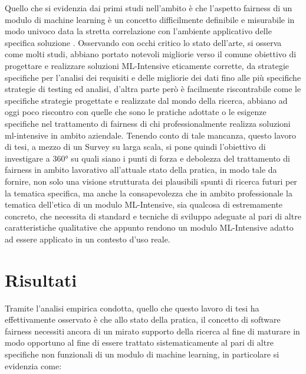Quello che si evidenzia dai primi studi nell'ambito è che l'aspetto fairness di un modulo di machine learning è un concetto difficilmente definibile e misurabile in modo univoco data la stretta correlazione con l'ambiente applicativo delle specifica soluzione \cite{FairnessDefinitionExplained}. Osservando con occhi critico lo stato dell'arte, si osserva come molti studi, abbiano portato notevoli migliorie verso il comune obiettivo di progettare e realizzare soluzioni ML-Intensive eticamente corrette, da strategie specifiche per l'analisi dei requisiti e delle migliorie dei dati fino alle più specifiche strategie di testing ed analisi, d'altra parte però è facilmente riscontrabile come le specifiche strategie progettate e realizzate dal mondo della ricerca, abbiano ad oggi poco riscontro con quelle che sono le pratiche adottate o le esigenze specifiche nel trattamento di fairness di chi professionalmente realizza soluzioni ml-intensive in ambito aziendale. Tenendo conto di tale mancanza, questo lavoro di tesi, a mezzo di un Survey su larga scala, si pone quindi l'obiettivo di investigare a 360° su quali siano i punti di forza e debolezza del trattamento di fairness in ambito lavorativo all'attuale stato della pratica, in modo tale da fornire, non solo una visione strutturata dei plausibili spunti di ricerca futuri per la tematica specifica, ma anche la consapevolezza che in ambito professionale la tematica dell'etica di un modulo ML-Intensive, sia qualcosa di estremamente concreto, che necessita di standard e tecniche di sviluppo adeguate al pari di altre caratteristiche qualitative che appunto rendono un modulo ML-Intensive adatto ad essere applicato in un contesto d'uso reale.

\section{Risultati}
Tramite l'analisi empirica condotta, quello che questo lavoro di tesi ha effettivamente osservato è che allo stato della pratica, il concetto di software fairness necessiti ancora di un mirato supporto della ricerca al fine di maturare in modo opportuno al fine di essere trattato sistematicamente al pari di altre specifiche non funzionali di un modulo di machine learning, in particolare si evidenzia come:

